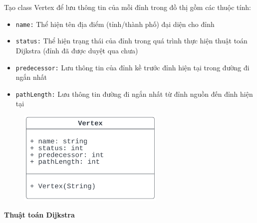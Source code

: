 \documentclass[a4paper]{article}
\begin{document}
Tạo class Vertex để lưu thông tin của mỗi đỉnh trong đồ thị gồm các thuộc tính:
\begin{itemize}
\item \texttt{name:} Thể hiện tên địa điểm (tỉnh/thành phố) đại diện cho đỉnh
\item \texttt{status:} Thể hiện trạng thái của đỉnh trong quá trình thực hiện thuật toán Dijkstra (đỉnh đã được duyệt qua chưa)
\item \texttt{predecessor:} Lưu thông tin của đỉnh kề trước đỉnh hiện tại trong đường đi ngắn nhất
\item \texttt{pathLength:} Lưu thông tin đường đi ngắn nhất từ đỉnh nguồn đến đỉnh hiện tại
\end{itemize}
\begin{figure}[!ht]
    \centering
    \includegraphics[width=7cm]{vertex.png}
    \label{fig:vertex}
\end{figure}

\textbf{Thuật toán Dijkstra}\\
\end{document}
